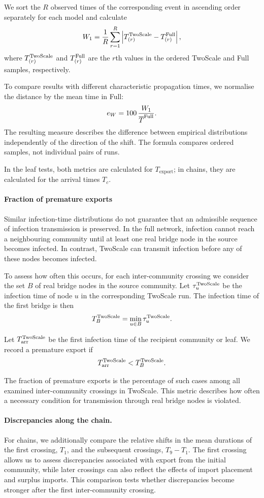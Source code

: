 \documentclass{ieeeaccess}
\newcommand{\Full}{\textup{Full}}
\newcommand{\TS}{\textup{TwoScale}}
\newcommand{\eW}{e_{W}}
\begin{document}
We sort the $R$ observed times of the corresponding event in ascending order separately for each model and calculate
\[
W_1 =
\frac{1}{R}
\sum_{r=1}^{R}
\left|
T_{(r)}^{\TS}-T_{(r)}^{\Full}
\right|,
\]
where $T_{(r)}^{\TS}$ and $T_{(r)}^{\Full}$ are the $r$th values in the ordered \TS{} and \Full{} samples, respectively.

To compare results with different characteristic propagation times, we normalise the distance by the mean time in \Full{}:
\[
\eW =
100\,\frac{W_1}{\overline{T}^{\Full}}.
\]
The resulting measure describes the difference between empirical distributions independently of the direction of the shift. The formula compares ordered samples, not individual pairs of runs.

In the leaf tests, both metrics are calculated for $T_{\mathrm{export}}$; in chains, they are calculated for the arrival times $T_c$.

\paragraph{Fraction of premature exports}
Similar infection-time distributions do not guarantee that an admissible sequence of infection transmission is preserved. In the full network, infection cannot reach a neighbouring community until at least one real bridge node in the source becomes infected. In contrast, \TS{} can transmit infection before any of these nodes becomes infected.

To assess how often this occurs, for each inter-community crossing we consider the set $B$ of real bridge nodes in the source community. Let $\tau_u^{\TS}$ be the infection time of node $u$ in the corresponding \TS{} run. The infection time of the first bridge is then
\[
T_B^{\TS}=\min_{u\in B}\tau_u^{\TS}.
\]

Let $T_{\mathrm{arr}}^{\TS}$ be the first infection time of the recipient community or leaf. We record a premature export if
\[
T_{\mathrm{arr}}^{\TS}<T_B^{\TS}.
\]

The fraction of premature exports is the percentage of such cases among all examined inter-community crossings in \TS{}. This metric describes how often a necessary condition for transmission through real bridge nodes is violated.

\paragraph{Discrepancies along the chain.}
For chains, we additionally compare the relative shifts in the mean durations of the first crossing, $T_1$, and the subsequent crossings, $T_9-T_1$. The first crossing allows us to assess discrepancies associated with export from the initial community, while later crossings can also reflect the effects of import placement and surplus imports. This comparison tests whether discrepancies become stronger after the first inter-community crossing.
\end{document}
